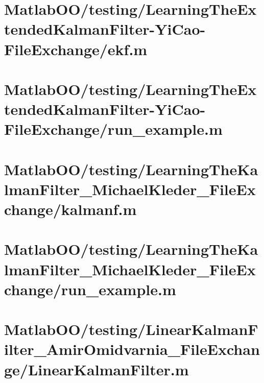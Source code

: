 \pagebreak
\section{MatlabOO/testing/LearningTheExtendedKalmanFilter-YiCao-FileExchange/ekf.m}\label{code:MatlabOO/testing/LearningTheExtendedKalmanFilter-YiCao-FileExchange/ekf.m}


\pagebreak
\section{MatlabOO/testing/LearningTheExtendedKalmanFilter-YiCao-FileExchange/run\_example.m}\label{code:MatlabOO/testing/LearningTheExtendedKalmanFilter-YiCao-FileExchange/run_example.m}


\pagebreak
\section{MatlabOO/testing/LearningTheKalmanFilter\_MichaelKleder\_FileExchange/kalmanf.m}\label{code:MatlabOO/testing/LearningTheKalmanFilter_MichaelKleder_FileExchange/kalmanf.m}


\pagebreak
\section{MatlabOO/testing/LearningTheKalmanFilter\_MichaelKleder\_FileExchange/run\_example.m}\label{code:MatlabOO/testing/LearningTheKalmanFilter_MichaelKleder_FileExchange/run_example.m}


\pagebreak
\section{MatlabOO/testing/LinearKalmanFilter\_AmirOmidvarnia\_FileExchange/LinearKalmanFilter.m}\label{code:MatlabOO/testing/LinearKalmanFilter_AmirOmidvarnia_FileExchange/LinearKalmanFilter.m}


